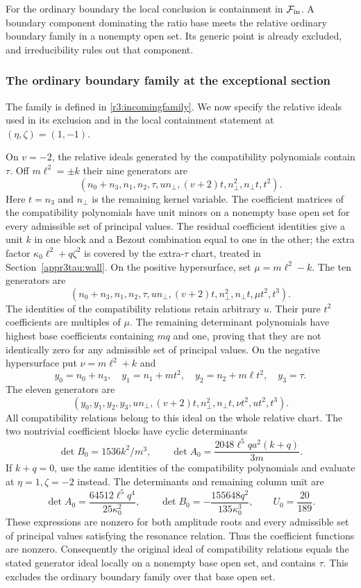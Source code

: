 \documentclass[11pt,a4paper]{article}
\numberwithin{equation}{section}
\theoremstyle{plain}
\theoremstyle{definition}
\theoremstyle{remark}
\begin{document}
For the ordinary boundary the local conclusion is containment in
$\mathcal F_{\rm in}$. A boundary component dominating the ratio base meets the relative ordinary boundary family in a nonempty open set. Its generic point is already excluded, and irreducibility rules out that component. 

\subsubsection{The ordinary boundary family at the exceptional section}\label{r3:ordinary-supports}
The family is defined in \eqref{r3:incomingfamily}. We now specify the
relative ideals used in its exclusion and in the local containment
statement at $(\eta ,\zeta )=(1,-1)$.

On $v=-2$, the relative ideals generated by the compatibility polynomials contain $\tau$.
Off $m\ell^2=\pm k$ their nine generators are
\[
 (n_0+n_3,n_1,n_2,\tau,un_\perp,(v+2)t,n_\perp^2,n_\perp t,t^2).
\]
Here $t=n_3$ and $n_\perp$ is the remaining kernel variable.
The coefficient matrices of the compatibility polynomials have unit minors on a nonempty
base open set for every admissible set of principal values. The residual coefficient identities
give a unit $k$ in one block and a Bezout combination equal to one in
the other; the extra factor $\kappa_0 \ell^2+q\zeta ^2$ is covered by the extra-$\tau$
chart, treated in Section~\ref{appr3tau:wall}.
On the positive hypersurface, set $\mu=m\ell^2-k$. The ten generators are
\[
 (n_0+n_3,n_1,n_2,\tau,un_\perp,(v+2)t,n_\perp^2,n_\perp t,\mu t^2,t^3).
\]
The identities of the compatibility relations retain arbitrary $u$. Their pure $t^2$ coefficients are multiples of $\mu$.
The remaining determinant polynomials have highest base coefficients
containing $mq$ and one, proving that they are not identically zero for
any admissible set of principal values. On the negative hypersurface put $\nu=m\ell^2+k$ and
\[
 y_0=n_0+n_3,\quad y_1=n_1+mt^2,\quad
 y_2=n_2+m\ell t^2,\quad y_3=\tau.
\]
The eleven generators are
\[
 (y_0,y_1,y_2,y_3,un_\perp,(v+2)t,n_\perp^2,n_\perp t,\nu t^2,ut^2,t^3).
\]
All compatibility relations belong to this ideal on the whole relative chart.
The two nontrivial coefficient blocks have cyclic determinants
\[
 \det B_0=1536k^2/m^3,\qquad
 \det A_0=\frac{2048\ell^5qa^2(k+q)}{3m}.
\]
If $k+q=0$, use the same identities of the compatibility polynomials and evaluate at
$\eta =1,\zeta =-2$ instead. The determinants and remaining column unit are
\[
 \det A_0=\frac{64512\ell^5q^4}{25\kappa_0 ^2},\qquad
 \det B_0=-\frac{155648q^2}{135\kappa_0 ^3},\qquad U_0=\frac{20}{189}.
\]
These expressions are nonzero for both amplitude roots and every
admissible set of principal values satisfying the resonance relation. Thus the coefficient functions are nonzero. Consequently the original
ideal of compatibility relations equals the stated generator ideal locally on a nonempty
base open set, and contains $\tau$. This excludes the ordinary boundary family over that base open set.
\end{document}
